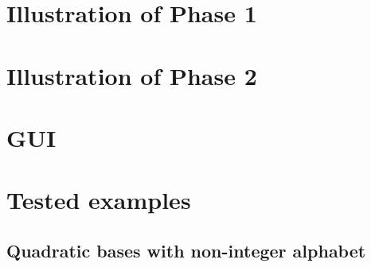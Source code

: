 \section{Illustration of Phase 1}
\section{Illustration of Phase 2}

\section{GUI}
\section{Tested examples}

\subsection*{Quadratic bases with non-integer alphabet}


%
%
%